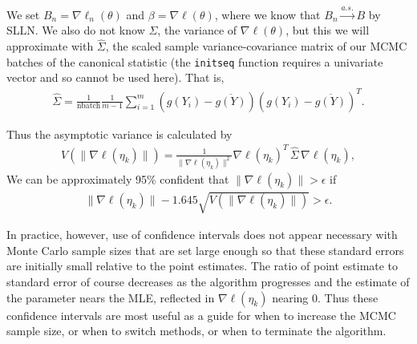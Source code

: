 We set $B_n = \nabla \ell_n( \theta)$ and $\beta =\nabla \ell( \theta)$, where we 
know that $B_n \stackrel{a.s.}{\longrightarrow} B$ by SLLN.  
We also do not know $\Sigma$, the variance of $\nabla \ell( \theta)$, but this we will 
approximate with $
\hat{\Sigma}$, the scaled sample variance-covariance matrix of our MCMC batches of 
the canonical statistic (the \texttt{initseq} function 
requires a univariate vector and so cannot be used here).  That is,
\begin{align*}
	\hat{\Sigma} = \frac{1}{\text{nbatch}}\frac{1}{m-1}\sum_{i=1}^{m} (g(Y_i) - \overline{g
(Y)})( g(Y_i) - 
\overline{g(Y)})^T.
\end{align*}

Thus the asymptotic variance is calculated by
\begin{align*}
	V \left( \lVert \nabla \ell( \eta_k ) \rVert \right )= \frac{1}{\lVert \nabla \ell
( \eta_k ) \rVert^2} \nabla \ell
( \eta_k )^T \, \hat{\Sigma} \,  \nabla \ell( \eta_k ),
\end{align*}%
We can be approximately 95\% confident that $\lVert 
\nabla \ell( \eta_k ) \rVert > \epsilon$ if 
\begin{align*}
	\lVert \nabla \ell( \eta_k ) \rVert - 1.645 \sqrt{ V \left( \lVert \nabla \ell
( \eta_k ) \rVert \right )} > 
\epsilon.
\end{align*}

In practice, however, use of confidence intervals does not appear necessary with  
Monte Carlo sample sizes that are set 
large enough so that these standard errors are initially small relative to the point 
estimates.  The ratio of point 
estimate to standard error of course decreases as the algorithm progresses and the 
estimate of the parameter nears the 
MLE, reflected in $\nabla \ell( \eta_k )$ nearing 0.  Thus these confidence intervals 
are most useful as a guide for
when to increase the MCMC sample size, or when to switch methods, or when to terminate 
the algorithm.



